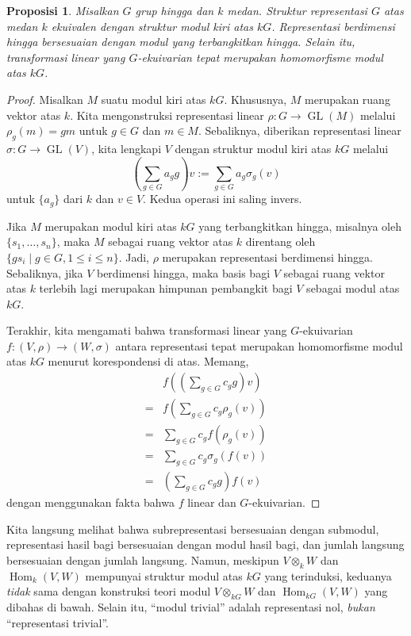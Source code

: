 \documentclass[12pt]{article}
\theoremstyle{plain}
\newtheorem{proposition}[theorem]{Proposisi}
\theoremstyle{definition}
\theoremstyle{remark}
\numberwithin{equation}{section}
\begin{document}
\begin{proposition} \label{prop:equivalence}
Misalkan $G$ grup hingga dan $k$ medan.
Struktur representasi $G$ atas medan $k$
ekuivalen dengan struktur modul kiri atas $kG$.
Representasi berdimensi hingga bersesuaian dengan
modul yang terbangkitkan hingga.
Selain itu, transformasi linear yang $G$-ekuivarian tepat merupakan
homomorfisme modul atas $kG$.
\end{proposition}

\begin{proof}
Misalkan $M$ suatu modul kiri atas $kG$.
Khususnya, $M$ merupakan ruang vektor atas $k$.
Kita mengonstruksi representasi linear $\rho : G \to \operatorname{GL}(M)$
melalui $\rho_g(m)=gm$ untuk $g \in G$ dan $m\in M$.
Sebaliknya, diberikan representasi linear $\sigma : G \to
\operatorname{GL}(V)$, kita lengkapi $V$ dengan struktur modul kiri atas $kG$ melalui
\[
\left( \sum_{g \in G} a_g g \right) v := \sum_{g \in G} a_g \sigma_g(v)
\]
untuk $\{a_g\}$ dari $k$ dan $v \in V$.
Kedua operasi ini saling invers.

Jika $M$ merupakan modul kiri atas $kG$ yang terbangkitkan hingga,
misalnya oleh $\{s_1,\ldots,s_n\}$, maka $M$ sebagai ruang vektor atas $k$
direntang oleh $\{ gs_i \mid g \in G, 1 \le i \le n \}$.
Jadi, $\rho$ merupakan representasi berdimensi hingga.
Sebaliknya, jika $V$ berdimensi hingga, maka basis bagi $V$
sebagai ruang vektor atas $k$ terlebih lagi merupakan himpunan pembangkit bagi $V$ sebagai
modul atas $kG$.

Terakhir, kita mengamati bahwa transformasi linear yang $G$-ekuivarian
$f : (V,\rho) \to (W,\sigma)$ antara representasi tepat merupakan homomorfisme modul atas $kG$
menurut korespondensi di atas.
Memang,
\begin{align*}
&f\left( \left( \sum_{g\in G} c_g g \right) v \right)\\
=& f\left( \sum_{g\in G} c_g \rho_g(v) \right)\\
=& \sum_{g\in G} c_g f\left( \rho_g(v) \right)\\
=& \sum_{g\in G} c_g \sigma_g\left(f(v)\right)\\
=& \left(\sum_{g\in G} c_g g\right) f(v)
\end{align*}
dengan menggunakan fakta bahwa $f$ linear dan $G$-ekuivarian.
\end{proof}

Kita langsung melihat bahwa subrepresentasi bersesuaian dengan submodul,
representasi hasil bagi bersesuaian dengan modul hasil bagi, dan jumlah langsung
bersesuaian dengan jumlah langsung.
Namun, meskipun $V \otimes_k W$ dan $\operatorname{Hom}_k(V,W)$ mempunyai
struktur modul atas $kG$ yang terinduksi, keduanya \emph{tidak} sama dengan
konstruksi teori modul $V \otimes_{kG} W$
dan $\operatorname{Hom}_{kG}(V,W)$ yang dibahas di bawah.
Selain itu, “modul trivial” adalah representasi nol,
\emph{bukan} “representasi trivial”.
\end{document}
